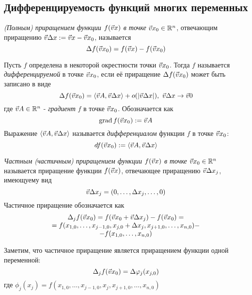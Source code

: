 \begin{multicols}{2}
    \subsection*{Дифференцируемость функций многих переменных}

    \begin{definition}{}{}
        \textit{(Полным) приращением функции $f(\vec{v}{x})$ в точке} $\vec{v}{x}_0 \in \mathbb{R}^n$, отвечающим приращению $\vec{v}{\Delta x} := \vec{v}{x} - \vec{v}{x_0}$, называется
        \[
            \Delta f(\vec{v}{x}_0) = f(\vec{v}{x}) - f(\vec{v}{x}_0)
        \]
    \end{definition}
    \begin{definition}{}{}
        Пусть $f$ определена в некоторой окрестности точки $\vec{v}{x}_0$. Тогда $f$ называется \textit{дифференцируемой} в точке $\vec{v}{x}_0$, если её приращение $\Delta f(\vec{v}{x}_0)$ может быть записано в виде
        \[
            \Delta f(\vec{v}{x}_0) = \left\langle\vec{v}{A}, \vec{v}{\Delta x}\right\rangle + o(|\vec{v}{\Delta x}|),\ \vec{v}{\Delta x} \to \vec{v}{0}
        \]
        где $\vec{v}{A} \in \mathbb{R}^n$ - \textit{градиент} $f$ в точке $\vec{v}{x}_0$. Обозначается как
        \[
            \operatorname{grad} f(\vec{v}{x}_0) := \vec{v}{A}
        \]
        Выражение $\left\langle\vec{v}{A}, \vec{v}{\Delta x}\right\rangle$ называется \textit{дифференциалом} функции $f$ в точке $\vec{v}{x}_0$:
        \[
            df(\vec{v}{x}_0) := \left\langle\vec{v}{A}, \vec{v}{\Delta x}\right\rangle
        \]
    \end{definition}
    
    \begin{definition}{}{}
        \textit{Частным (частичным) приращением функции $f(\vec{v}{x})$ в точке} $\vec{v}{x}_0 \in \mathbb{R}^n$ называется приращение функции $f(\vec{v}{x})$, отвечающее 	приращению $\vec{v}{\Delta x}_j$, имеющуему вид
        \[
            \vec{v}{\Delta x}_j = (0, \ldots, \Delta x_j, \ldots, 0)
        \]
        Частичное приращение обозначается как
        \[
            \begin{array}{c}
                \Delta_j f(\vec{v}{x}_0) = f(\vec{v}{x}_0 + \vec{v}{\Delta x_j}) - f(\vec{v}{x}_0) = \\ = f(x_{1, 0}, \ldots, x_{j - 1, 0}, x_{j, 0} + \Delta x_j, x_{j + 1, 0}, \ldots, x_{n, 0}) - \\ - f(x_{1, 0}, \ldots, x_{n, 0})                
            \end{array}
        \]
    \end{definition}
    
    \begin{note}{}{}
        Заметим, что частичное приращение является приращением функции одной переменной:
        \[
            \Delta_j f(\vec{v}{x}_0) = \Delta \varphi_j (x_{j, 0})
        \]
        где $\phi_j(x_j) = f(x_{1, 0}, \ldots, x_{j - 1, 0}, x_j, x_{j + 1, 0}, \ldots, x_{n, 0})$
    \end{note}
    

\end{multicols}
